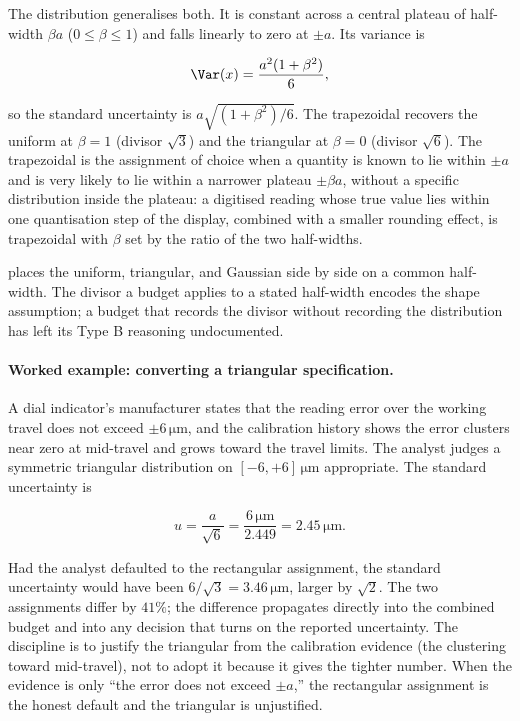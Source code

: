The  distribution generalises both. It is
constant across a central plateau of half-width $\beta a$
($0 \leq \beta \leq 1$) and falls linearly to zero at $\pm a$. Its
variance is

\[
\Var(x) = \frac{a^{2}(1 + \beta^{2})}{6},
\]

so the standard uncertainty is $a\sqrt{(1 + \beta^{2})/6}$. The
trapezoidal recovers the uniform at $\beta = 1$ (divisor $\sqrt{3}$)
and the triangular at $\beta = 0$ (divisor $\sqrt{6}$). The
trapezoidal is the assignment of choice when a quantity is known to
lie within $\pm a$ and is very likely to lie within a narrower
plateau $\pm \beta a$, without a specific distribution inside the
plateau: a digitised reading whose true value lies within one
quantisation step of the display, combined with a smaller
rounding effect, is trapezoidal with $\beta$ set by the ratio of
the two half-widths.



 places the uniform,
triangular, and Gaussian side by side on a common half-width. The
divisor a budget applies to a stated half-width encodes the shape
assumption; a budget that records the divisor without recording the
distribution has left its Type B reasoning undocumented.

\paragraph{Worked example: converting a triangular specification.}
A dial indicator's manufacturer states that the reading error over
the working travel does not exceed $\pm 6\,\si{\micro\meter}$, and
the calibration history shows the error clusters near zero at
mid-travel and grows toward the travel limits. The analyst judges a
symmetric triangular distribution on $[-6, +6]\,\si{\micro\meter}$
appropriate. The standard uncertainty is

\[
u = \frac{a}{\sqrt{6}} = \frac{6\,\si{\micro\meter}}{2.449}
= 2.45\,\si{\micro\meter}.
\]

Had the analyst defaulted to the rectangular assignment, the
standard uncertainty would have been $6/\sqrt{3} = 3.46\,\si{
\micro\meter}$, larger by $\sqrt{2}$. The two assignments differ by
$41\%$; the difference propagates directly into the combined budget
and into any decision that turns on the reported uncertainty. The
discipline is to justify the triangular from the calibration
evidence (the clustering toward mid-travel), not to adopt it because
it gives the tighter number. When the evidence is only ``the error
does not exceed $\pm a$,'' the rectangular assignment is the honest
default and the triangular is unjustified.

